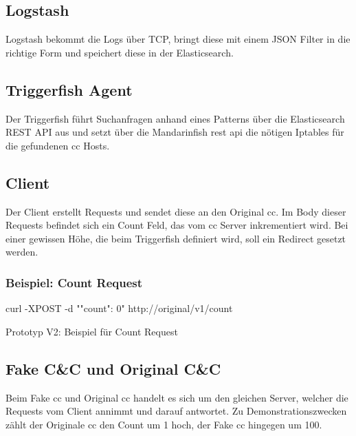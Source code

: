 \subsection{Logstash}
Logstash bekommt die Logs über TCP, bringt diese mit einem JSON Filter in die richtige Form und speichert diese in der Elasticsearch.



\subsection{Triggerfish Agent}
Der Triggerfish führt Suchanfragen anhand eines Patterns über die Elasticsearch REST API aus und setzt über die Mandarinfish \gls{rest} \gls{api} die nötigen Iptables für die gefundenen \gls{cc} Hosts.

\subsection{Client}
Der Client erstellt Requests und sendet diese an den Original \gls{cc}. Im Body dieser Requests befindet sich ein Count Feld, das vom \gls{cc} Server inkrementiert wird. Bei einer gewissen Höhe, die beim Triggerfish definiert wird, soll ein Redirect gesetzt werden.\\


\begin{listing}[H]
\subsubsection{Beispiel: Count Request}
\begin{fancycode}
curl -XPOST -d "{"count": 0}" http://original/v1/count
\end{fancycode}
\caption{Prototyp V2: Beispiel für Count Request}
\label{lst:cc-request}
\end{listing}

\newpage
\subsection{Fake C\&C und Original C\&C}   
Beim Fake \gls{cc} und Original \gls{cc} handelt es sich um den gleichen Server, welcher die Requests vom Client annimmt und darauf antwortet.
Zu Demonstrationszwecken zählt der Originale \gls{cc} den Count um 1 hoch, der Fake \gls{cc} hingegen um 100.

